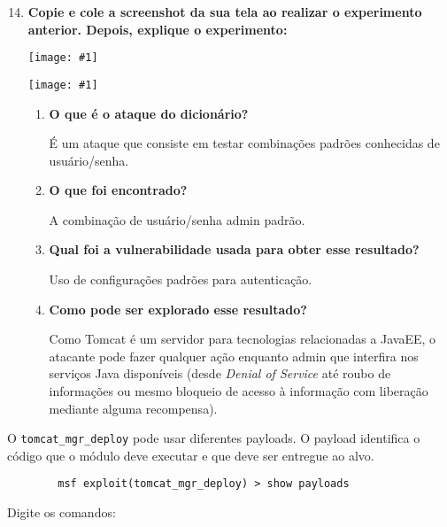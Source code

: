 \documentclass{article}
\newcommand{\code}[1]{\texttt{#1}}
\newcommand{\img}[1]{%
    \texttt{[image: \#1]}
}
\begin{document}
    \begin{enumerate}
        \setcounter{enumi}{13}
        \item \textbf{Copie e cole a screenshot da sua tela ao realizar o
            experimento anterior. Depois, explique o experimento:}

            \img{imgs/options}
            \img{imgs/login_exploit}

            \begin{enumerate}
                \item \textbf{O que é o ataque do dicionário?}

                    É um ataque que consiste em testar combinações padrões
                    conhecidas de usuário/senha.

                \item \textbf{O que foi encontrado?}

                    A combinação de usuário/senha admin padrão.

                \item \textbf{Qual foi a vulnerabilidade usada para obter
                    esse resultado?}

                    Uso de configurações padrões para autenticação.

                \item \textbf{Como pode ser explorado esse resultado?}

                    Como Tomcat é um servidor para tecnologias relacionadas
                    a JavaEE, o atacante pode fazer qualquer ação enquanto
                    admin que interfira nos serviços Java disponíveis
                    (desde \textit{Denial of Service} até roubo de
                    informações ou mesmo bloqueio de acesso à informação
                    com liberação mediante alguma recompensa).
            \end{enumerate}
    \end{enumerate}

    O \code{tomcat\_mgr\_deploy} pode usar diferentes payloads. O payload
    identifica o código que o módulo deve executar e que deve ser entregue ao
    alvo.

    \begin{verbatim}
        msf exploit(tomcat_mgr_deploy) > show payloads
    \end{verbatim}

    Digite os comandos:
\end{document}
